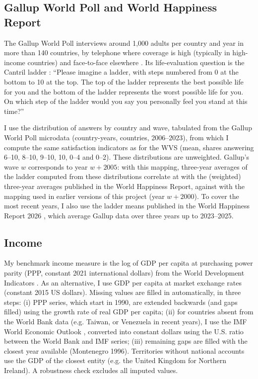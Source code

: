 \subsection{Gallup World Poll and World Happiness Report}\label{subsec:gallup}

The Gallup World Poll interviews around 1,000 adults per country and year in more than 140 countries, by telephone where coverage is high (typically in high-income countries) and face-to-face elsewhere \citep{gallup_methodology_2022}. Its life-evaluation question is the Cantril ladder \citep{cantril_pattern_1965}: ``Please imagine a ladder, with steps numbered from 0 at the bottom to 10 at the top. The top of the ladder represents the best possible life for you and the bottom of the ladder represents the worst possible life for you. On which step of the ladder would you say you personally feel you stand at this time?''

I use the distribution of answers by country and wave, tabulated from the Gallup World Poll microdata (\nGallupCountryYears country-years, \nGallupCountries countries, 2006--2023), from which I compute the same satisfaction indicators as for the WVS (mean, shares answering 6--10, 8--10, 9--10, 10, 0--4 and 0--2). These distributions are unweighted. Gallup's wave $w$ corresponds to year $w+2005$: with this mapping, three-year averages of the ladder computed from these distributions correlate at \corGallupWHR with the (weighted) three-year averages published in the World Happiness Report, against \corGallupWHRoldMapping with the mapping used in earlier versions of this project (year $w+2000$). To cover the most recent years, I also use the ladder means published in the World Happiness Report 2026 \citep{whr_2026}, which average Gallup data over three years up to 2023--2025.

\subsection{Income}\label{subsec:income}

My benchmark income measure is the log of GDP per capita at purchasing power parity (PPP, constant 2021 international dollars) from the World Development Indicators \citep{worldbank_wdi_2026}. As an alternative, I use GDP per capita at market exchange rates (constant 2015 US dollars). Missing values are filled in automatically, in three steps: (i) PPP series, which start in 1990, are extended backwards (and gaps filled) using the growth rate of real GDP per capita; (ii) for countries absent from the World Bank data (e.g. Taiwan, or Venezuela in recent years), I use the IMF World Economic Outlook \citep{imf_weo_2026}, converted into constant dollars using the U.S. ratio between the World Bank and IMF series; (iii) remaining gaps are filled with the closest year available (Montenegro 1996). Territories without national accounts use the GDP of the closest entity (e.g. the United Kingdom for Northern Ireland). A robustness check excludes all imputed values.

